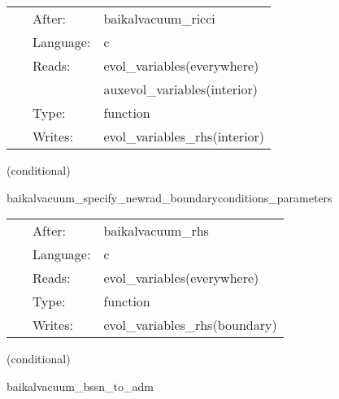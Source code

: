\hspace{5mm}{\it evaluate bssn rhss, at finite-differencing order 8 } 


\hspace{5mm}

 \begin{tabular*}{160mm}{cll} 
~ & After:  & baikalvacuum\_ricci \\ 
~ & Language:  & c \\ 
~ & Reads:  & evol\_variables(everywhere) \\ 
~& ~ &auxevol\_variables(interior)\\ 
~ & Type:  & function \\ 
~ & Writes:  & evol\_variables\_rhs(interior) \\ 
\end{tabular*} 


\vspace{5mm}

   (conditional) 

\hspace{5mm} baikalvacuum\_specify\_newrad\_boundaryconditions\_parameters 

\hspace{5mm}{\it newrad boundary conditions, scheduled right after rhs eval. } 


\hspace{5mm}

 \begin{tabular*}{160mm}{cll} 
~ & After:  & baikalvacuum\_rhs \\ 
~ & Language:  & c \\ 
~ & Reads:  & evol\_variables(everywhere) \\ 
~ & Type:  & function \\ 
~ & Writes:  & evol\_variables\_rhs(boundary) \\ 
\end{tabular*} 


\vspace{5mm}

   (conditional) 

\hspace{5mm} baikalvacuum\_bssn\_to\_adm 

\hspace{5mm}{\it perform bssn-to-adm conversion. useful for diagnostics. } 


\hspace{5mm}

